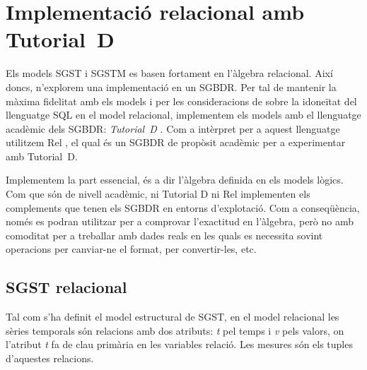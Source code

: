\chapter{Implementació relacional amb Tutorial~D}

Els models \gls{SGST} i \gls{SGSTM} es basen fortament en l'àlgebra
relacional.  Així doncs, n'explorem una implementació en un
\gls{SGBDR}. Per tal de mantenir la màxima fidelitat amb els models i
per les consideracions de \textcite[cap.~1--4]{date04:introduction8}
sobre la idoneïtat del llenguatge \gls{SQL} en el model relacional,
implementem els models amb el llenguatge acadèmic dels \gls{SGBDR}:
\emph{Tutorial~D} \parencite{date04:introduction8,date:thethirdmanifesto,date:tutoriald}. Com
a intèrpret per a aquest llenguatge utilitzem Rel \parencite{rel}, el
qual és un \gls{SGBDR} de propòsit acadèmic per a experimentar amb
Tutorial~D.




\todo{}

Implementem la part essencial, és a dir l'àlgebra definida en els
models lògics. Com que són de nivell acadèmic, ni Tutorial D ni Rel
implementen els complements que tenen els SGBDR en entorns
d'explotació. Com a conseqüència, només es podran utilitzar per a
comprovar l'exactitud en l'àlgebra, però no amb comoditat per a
treballar amb dades reals en les quals es necessita sovint operacions per canviar-ne el format, per convertir-les, etc.\todo{}




\section{SGST relacional}


Tal com s'ha definit el model estructural de SGST, en el model
relacional les sèries temporals són relacions amb dos atributs:
\emph{t} pel temps i \emph{v} pels valors, on l'atribut \emph{t} fa de
clau primària en les variables relació.  Les mesures són els tuples
d'aquestes relacions. 

